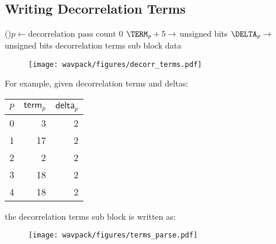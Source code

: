 
\subsection{Writing Decorrelation Terms}
\label{wavpack:write_decorr_terms}
\For(){$p \leftarrow \text{decorrelation pass count}$ \emph{\KwDownTo}0}{
  $\text{\TERM}_p + 5 \rightarrow$  unsigned bits\;
  $\text{\DELTA}_p \rightarrow$  unsigned bits\;
}
\Return decorrelation terms sub block data\;
\EALGORITHM
\begin{figure}[h]
  \texttt{[image: wavpack/figures/decorr\_terms.pdf]}
\end{figure}

\clearpage
For example, given decorrelation terms and deltas:
\begin{table}[h]
\begin{tabular}{rrr}
$p$ & $\textsf{term}_p$ & $\textsf{delta}_p$ \\
\hline
0 & 3 & 2 \\
1 & 17 & 2 \\
2 & 2 & 2 \\
3 & 18 & 2 \\
4 & 18 & 2 \\
\end{tabular}
\end{table}
\par
\noindent
the decorrelation terms sub block is written as:
\begin{figure}[h]
\texttt{[image: wavpack/figures/terms\_parse.pdf]}
\end{figure}
